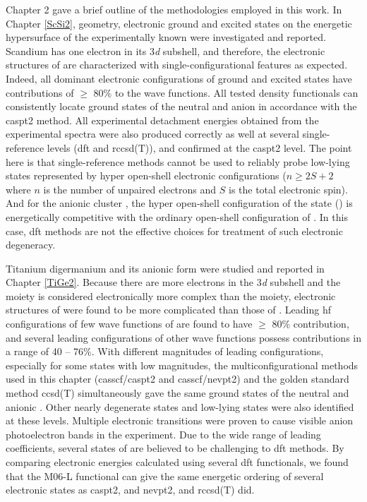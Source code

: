 \begin{refsection}
Chapter 2 gave a brief outline of the methodologies employed in this work. In Chapter \ref{ScSi2}, geometry, electronic ground and excited states on the energetic hypersurface of the experimentally known  were investigated and reported. Scandium has one electron in its 3\textit{d} subshell, and therefore, the electronic structures of  are characterized with single-configurational features as expected. Indeed, all dominant electronic configurations of ground and excited states have contributions of $\geq$ 80\% to the wave functions. All tested density functionals can consistently locate ground states of the neutral and anion in accordance with the \acrshort{caspt2} method. All experimental detachment energies obtained from the experimental spectra were also produced correctly as well at several single-reference levels (\acrshort{dft} and \acrshort{rccsd}(T)), and confirmed at the \acrshort{caspt2} level. The point here is that single-reference methods cannot be used to reliably probe low-lying states represented by hyper open-shell electronic configurations \cite{con:1} ($n \geq 2S + 2$ where $n$ is the number of unpaired electrons and $S$ is the total electronic spin). And for the anionic cluster , the hyper open-shell configuration of the state  () is energetically competitive with the ordinary open-shell configuration of . In this case, \acrshort{dft} methods are not the effective choices for treatment of such electronic degeneracy.   




Titanium digermanium and its anionic form were studied and reported in Chapter \ref{TiGe2}. Because there are more electrons in the 3\textit{d} subshell and the moiety  is considered electronically more complex than the  moiety, electronic structures of  were found to be more complicated than those of . Leading \acrshort{hf} configurations of few wave functions of  are found to have $\geq$ 80\% contribution, and several leading configurations of other wave functions possess contributions in a range of 40 -- 76\%. With different magnitudes of leading configurations, especially for some states with low magnitudes, the multiconfigurational methods used in this chapter (\acrshort{casscf}/\acrshort{caspt2} and \acrshort{casscf}/\acrshort{nevpt2}) and the golden standard method \acrshort{ccsd}(T) simultaneously gave the same ground states of the neutral and anionic . Other nearly degenerate states and low-lying states were also identified at these levels. Multiple electronic transitions were proven to cause visible anion photoelectron bands in the experiment. Due to the wide range of leading coefficients, several states of  are believed to be challenging to \acrshort{dft} methods. By comparing electronic energies calculated using several \acrshort{dft} functionals, we found that the M06-L functional can give the same energetic ordering of several electronic states as \acrshort{caspt2}, and \acrshort{nevpt2}, and \acrshort{rccsd}(T) did. 




\end{refsection}
